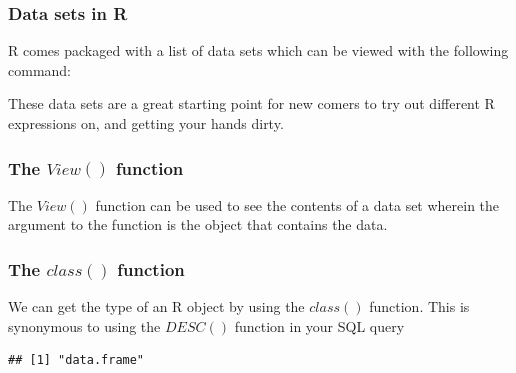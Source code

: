 \subsubsection{Data sets in R}
\noindent R comes packaged with a list of data sets which can be viewed with the following command: 
\begin{knitrout}
\color{fgcolor}\begin{kframe}
\begin{alltt}
\hlstd{(} \hlstd{=} \hlstd{)}
\end{alltt}
\end{kframe}
\end{knitrout}
\noindent These data sets are a great starting point for new comers to try out different R expressions on, and getting your hands dirty. 

\subsubsection{The $View()$ function}
\noindent The $View()$ function can be used to see the contents of a data set wherein the argument to the function is the object that contains the data.
\begin{knitrout}
\color{fgcolor}\begin{kframe}
\begin{alltt}
\end{alltt}
\end{kframe}
\end{knitrout}

\subsubsection{The $class()$ function}
\noindent We can get the type of an R object by using the $class()$ function. This is synonymous to using the $DESC()$ function in your SQL query  
\begin{knitrout}
\color{fgcolor}\begin{kframe}
\begin{alltt}
\end{alltt}
\begin{verbatim}
## [1] "data.frame"
\end{verbatim}
\end{kframe}
\end{knitrout}

